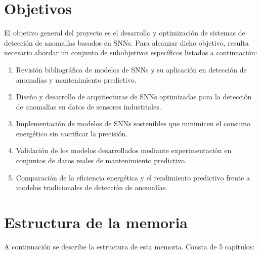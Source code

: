 \section{Objetivos}

El objetivo general del proyecto es el desarrollo y optimización de sistemas de detección de anomalías basados en SNNs. Para alcanzar dicho objetivo, resulta necesario abordar un conjunto de subobjetivos específicos listados a continuación:

\begin{enumerate}
    \item Revisión bibliográfica de modelos de SNNs y su aplicación en detección de anomalías y mantenimiento predictivo.
    \item Diseño y desarrollo de arquitecturas de SNNs optimizadas para la detección de anomalías en datos de sensores industriales.
    \item Implementación de modelos de SNNs sostenibles que minimicen el consumo energético sin sacrificar la precisión.
    \item Validación de los modelos desarrollados mediante experimentación en conjuntos de datos reales de mantenimiento predictivo.
    \item Comparación de la eficiencia energética y el rendimiento predictivo frente a modelos tradicionales de detección de anomalías.

\end{enumerate}


\section{Estructura de la memoria}


A continuación se describe la estructura de esta memoria. Consta de 5 capítulos:

